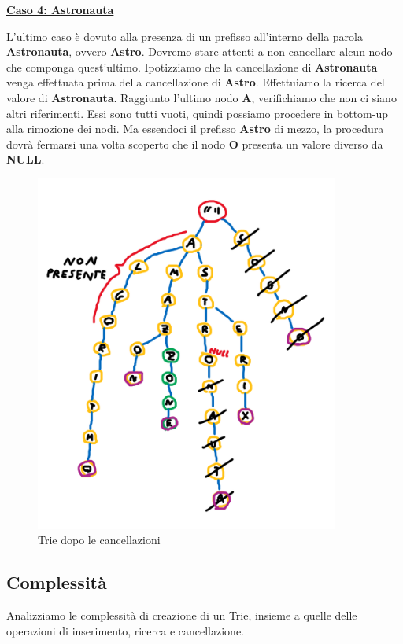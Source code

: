 \documentclass[a4paper, 12pt]{article}
\begin{document}
\vspace{5mm}

\textbf{\underline{Caso 4: Astronauta}}

\vspace{5mm}
L'ultimo caso è dovuto alla presenza di un prefisso all'interno della parola \textbf{Astronauta}, ovvero \textbf{Astro}. Dovremo stare attenti a non cancellare alcun nodo che componga quest'ultimo. Ipotizziamo che la cancellazione di \textbf{Astronauta} venga effettuata prima della cancellazione di \textbf{Astro}. Effettuiamo la ricerca del valore di \textbf{Astronauta}. Raggiunto l'ultimo nodo \textbf{A}, verifichiamo che non ci siano altri riferimenti. Essi sono tutti vuoti, quindi possiamo procedere in bottom-up alla rimozione dei nodi. Ma essendoci il prefisso \textbf{Astro} di mezzo, la procedura dovrà fermarsi una volta scoperto che il nodo \textbf{O} presenta un valore diverso da \textbf{NULL}.

\clearpage

\begin{figure}
    \centering
    \includegraphics[width=10cm]{Images/dopo cancellazione.png}
    \caption{Trie dopo le cancellazioni}
    \label{fig:my_label}
\end{figure}

\clearpage

\subsection{Complessità}
Analizziamo le complessità di creazione di un Trie, insieme a quelle delle operazioni di inserimento, ricerca e cancellazione.
\end{document}

